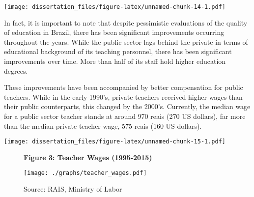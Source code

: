 \documentclass[12pt,]{book}
\newenvironment{Shaded}{\begin{snugshade}}{\end{snugshade}}
\newcommand{\DataTypeTok}[1]{\textcolor[rgb]{0.13,0.29,0.53}{#1}}
\newcommand{\DecValTok}[1]{\textcolor[rgb]{0.00,0.00,0.81}{#1}}
\newcommand{\KeywordTok}[1]{\textcolor[rgb]{0.13,0.29,0.53}{\textbf{#1}}}
\newcommand{\NormalTok}[1]{#1}
\newcommand{\OperatorTok}[1]{\textcolor[rgb]{0.81,0.36,0.00}{\textbf{#1}}}
\newcommand{\StringTok}[1]{\textcolor[rgb]{0.31,0.60,0.02}{#1}}
\begin{document}
\texttt{[image: dissertation\_files/figure-latex/unnamed-chunk-14-1.pdf]}

In fact, it is important to note that despite pessimistic evaluations of the quality of education in Brazil, there has been significant improvements occurring throughout the years. While the public sector lags behind the private in terms of educational background of its teaching personnel, there has been significant improvements over time. More than half of its staff hold higher education degrees.

These improvements have been accompanied by better compensation for public teachers. While in the early 1990's, private teachers received higher wages than their public counterparts, this changed by the 2000's. Currently, the median wage for a public sector teacher stands at around 970 reais (270 US dollars), far more than the median private teacher wage, 575 reais (160 US dollars).

\begin{Shaded}
\end{Shaded}

\texttt{[image: dissertation\_files/figure-latex/unnamed-chunk-15-1.pdf]}

\begin{figure}
    \centering
    \textbf{\small Figure 3: Teacher Wages (1995-2015)}\par\medskip
    \texttt{[image: ./graphs/teacher\_wages.pdf]}
    \caption*{\footnotesize \hfill Source: RAIS, Ministry of Labor}
\end{figure}
\end{document}
